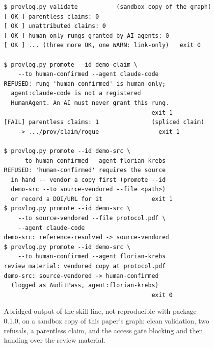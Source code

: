 \begin{figure}[t]
\centering
\fontsize{6.6}{7.6}\selectfont
\begin{verbatim}
$ provlog.py validate           (sandbox copy of the graph)
[ OK ] parentless claims: 0
[ OK ] unattributed claims: 0
[ OK ] human-only rungs granted by AI agents: 0
[ OK ] ... (three more OK, one WARN: link-only)   exit 0

$ provlog.py promote --id demo-claim \
    --to human-confirmed --agent claude-code
REFUSED: rung 'human-confirmed' is human-only;
  agent:claude-code is not a registered
  HumanAgent. An AI must never grant this rung.
                                          exit 1
[FAIL] parentless claims: 1               (spliced claim)
    -> .../prov/claim/rogue                 exit 1

$ provlog.py promote --id demo-src \
    --to human-confirmed --agent florian-krebs
REFUSED: 'human-confirmed' requires the source
  in hand -- vendor a copy first (promote --id
  demo-src --to source-vendored --file <path>)
  or record a DOI/URL for it              exit 1
$ provlog.py promote --id demo-src \
    --to source-vendored --file protocol.pdf \
    --agent claude-code
demo-src: reference-resolved -> source-vendored
$ provlog.py promote --id demo-src \
    --to human-confirmed --agent florian-krebs
review material: vendored copy at protocol.pdf
demo-src: source-vendored -> human-confirmed
  (logged as AuditPass, agent:florian-krebs)
                                          exit 0
\end{verbatim}
\caption{Abridged output of the skill line, not reproducible with
package 0.1.0, on a sandbox copy of this paper's graph: clean
validation, two refusals, a parentless claim, and the access gate
blocking and then handing over the review material.}
\label{fig:cli}
\end{figure}

